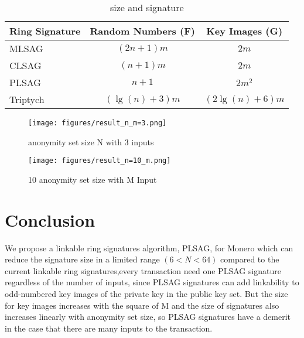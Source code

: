     \begin{table}[hbtp]  %
        \caption{size and signature}
        \label{table:data_type}
        \centering
        \begin{tabular}{|l|cc|}
            \hline
            Ring Signature  & Random Numbers (F) &  Key Images (G) \\
            \hline
            MLSAG  & $(2n+1)m$  & $2m$ \\
            CLSAG  & $(n+1)m$   & $2m$ \\
            PLSAG  & $n+1$  & $2m^2$ \\
            Triptych  & $(\lg (n)+3)m$   &  $(2\lg (n)+6)m$ \\
            \hline
        \end{tabular}
    \end{table}
    
    \begin{figure}[htbp]
        \begin{minipage}[b]{0.45\linewidth}
        \centering
        \texttt{[image: figures/result\_n\_m=3.png]}
        \caption{anonymity set size N with 3 inputs}
        \end{minipage}
        \begin{minipage}[b]{0.45\linewidth}
        \centering
        \texttt{[image: figures/result\_n=10\_m.png]}
        \caption{10 anonymity set size with M Input}
        \end{minipage}
    \end{figure}
    
\section{Conclusion}
    We propose a linkable ring signatures algorithm, PLSAG, for Monero which can reduce the signature size in a limited range $(6<N<64)$ compared to the current linkable ring signatures,every transaction need one PLSAG signature regardless of the number of inputs, since PLSAG signatures can add linkability to odd-numbered key images of the private key in the public key set. But the size for key images increases with the square of M and the size of signatures also increases linearly with anonymity set size, so PLSAG signatures have a demerit in the case that there are many inputs to the transaction.
